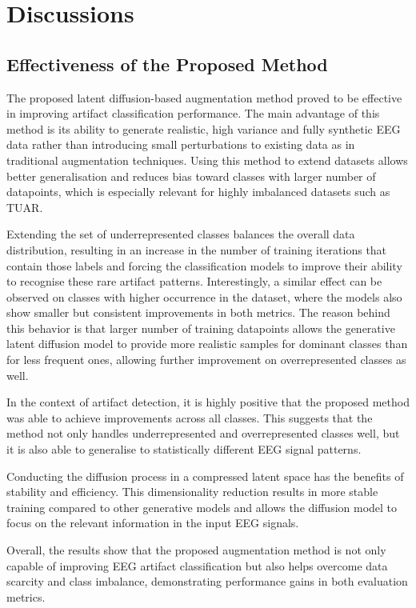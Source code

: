 \chapter{Discussions}

\section{Effectiveness of the Proposed Method}

The proposed latent diffusion-based augmentation method proved to be effective in improving artifact classification performance. The main advantage of this method is its ability to generate realistic, high variance and fully synthetic EEG data rather than introducing small perturbations to existing data as in traditional augmentation techniques. Using this method to extend datasets allows better generalisation and reduces bias toward classes with larger number of datapoints, which is especially relevant for highly imbalanced datasets such as TUAR. 

Extending the set of underrepresented classes balances the overall data distribution, resulting in an increase in the number of training iterations that contain those labels and forcing the classification models to improve their ability to recognise these rare artifact patterns. Interestingly, a similar effect can be observed on classes with higher occurrence in the dataset, where the models also show smaller but consistent improvements in both metrics. The reason behind this behavior is that larger number of training datapoints allows the generative latent diffusion model to provide more realistic samples for dominant classes than for less frequent ones, allowing further improvement on overrepresented classes as well. 

In the context of artifact detection, it is highly positive that the proposed method was able to achieve improvements across all classes. This suggests that the method not only handles underrepresented and overrepresented classes well, but it is also able to generalise to statistically different EEG signal patterns. 

Conducting the diffusion process in a compressed latent space has the benefits of stability and efficiency. This dimensionality reduction results in more stable training compared to other generative models and allows the diffusion model to focus on the relevant information in the input EEG signals.

Overall, the results show that the proposed augmentation method is not only capable of improving EEG artifact classification but also helps overcome data scarcity and class imbalance, demonstrating performance gains in both evaluation metrics.

